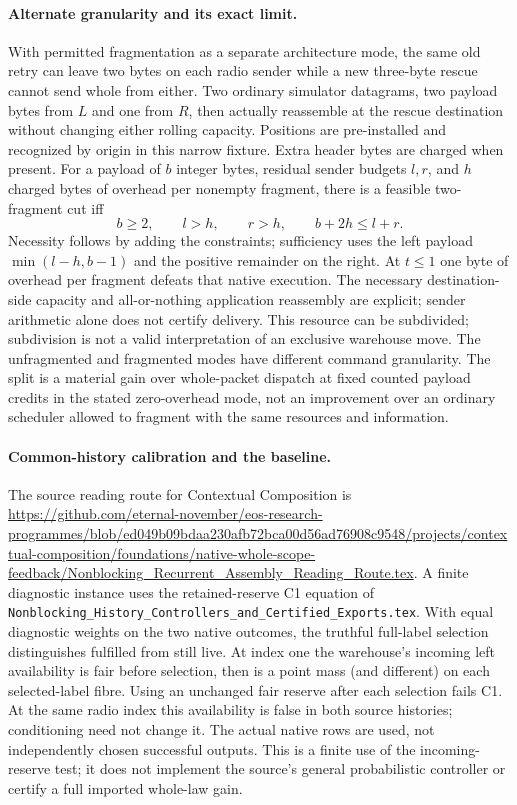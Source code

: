 \documentclass{article}
\begin{document}
\paragraph{Alternate granularity and its exact limit.}
With permitted fragmentation as a separate architecture mode, the same
old retry can leave two bytes on each radio sender while a new three-byte
rescue cannot send whole from either. Two ordinary simulator datagrams,
two payload bytes from $L$ and one from $R$, then actually reassemble at
the rescue destination without changing either rolling capacity. Positions
are pre-installed and recognized by origin in this narrow fixture. Extra
header bytes are charged when present. For a payload of $b$ integer bytes,
residual sender budgets $l,r$, and $h$ charged bytes of overhead per nonempty
fragment, there is a feasible two-fragment cut iff
\[
b\ge 2,\qquad l>h,\qquad r>h,\qquad b+2h\le l+r .
\]
Necessity follows by adding the constraints; sufficiency uses the left
payload $\min(l-h,b-1)$ and the positive remainder on the right. At
$t\le 1$ one byte of overhead per fragment defeats that native execution.
The necessary destination-side capacity and all-or-nothing application
reassembly are explicit; sender arithmetic alone does not certify delivery.
This resource can be subdivided; subdivision is not a valid interpretation
of an exclusive warehouse move. The unfragmented and fragmented modes have
different command granularity. The split is a material gain over whole-packet
dispatch at fixed counted payload credits in the stated zero-overhead mode,
not an improvement over an ordinary scheduler allowed to fragment with the
same resources and information.

\paragraph{Common-history calibration and the baseline.}
The source reading route for Contextual Composition is
\url{https://github.com/eternal-november/eos-research-programmes/blob/ed049b09bdaa230afb72bca00d56ad76908c9548/projects/contextual-composition/foundations/native-whole-scope-feedback/Nonblocking_Recurrent_Assembly_Reading_Route.tex}.
A finite diagnostic instance uses the retained-reserve C1 equation of
\texttt{Nonblocking\_History\_Controllers\_and\_Certified\_Exports.tex}.
With equal diagnostic weights on the two native outcomes, the truthful
full-label selection distinguishes fulfilled from still live. At index
one the warehouse's incoming left availability is fair before selection,
then is a point mass (and different) on each selected-label fibre.
Using an unchanged fair reserve after each selection fails C1. At the
same radio index this availability is false in both source histories;
conditioning need not change it. The actual native rows are used, not
independently chosen successful outputs. This is a finite use of the
incoming-reserve test; it does not implement the source's general
probabilistic controller or certify a full imported whole-law gain.
\end{document}
